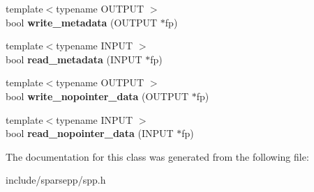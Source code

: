 \begin{DoxyCompactItemize}
\item 
{\footnotesize template$<$typename O\+U\+T\+P\+UT $>$ }\\bool {\bfseries write\+\_\+metadata} (O\+U\+T\+P\+UT $\ast$fp)\hypertarget{classspp___1_1sparse__hash__set_a55d24aad2765b89305a9e74f96b0ca13}{}\label{classspp___1_1sparse__hash__set_a55d24aad2765b89305a9e74f96b0ca13}

\item 
{\footnotesize template$<$typename I\+N\+P\+UT $>$ }\\bool {\bfseries read\+\_\+metadata} (I\+N\+P\+UT $\ast$fp)\hypertarget{classspp___1_1sparse__hash__set_a1c396e80e964df4f51ff3d292522f2c6}{}\label{classspp___1_1sparse__hash__set_a1c396e80e964df4f51ff3d292522f2c6}

\item 
{\footnotesize template$<$typename O\+U\+T\+P\+UT $>$ }\\bool {\bfseries write\+\_\+nopointer\+\_\+data} (O\+U\+T\+P\+UT $\ast$fp)\hypertarget{classspp___1_1sparse__hash__set_ac1eb6a1034991a7b338a8874a0cde644}{}\label{classspp___1_1sparse__hash__set_ac1eb6a1034991a7b338a8874a0cde644}

\item 
{\footnotesize template$<$typename I\+N\+P\+UT $>$ }\\bool {\bfseries read\+\_\+nopointer\+\_\+data} (I\+N\+P\+UT $\ast$fp)\hypertarget{classspp___1_1sparse__hash__set_a0436245db9d5bf6926c6463f9cdf1ae0}{}\label{classspp___1_1sparse__hash__set_a0436245db9d5bf6926c6463f9cdf1ae0}

\end{DoxyCompactItemize}


The documentation for this class was generated from the following file\+:\begin{DoxyCompactItemize}
\item 
include/sparsepp/spp.\+h\end{DoxyCompactItemize}
